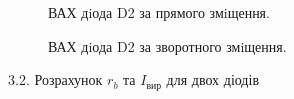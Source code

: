 \documentclass[14pt,a4paper]{scrartcl}
\begin{document}
\begin{figure}[h!]
\caption{ВАХ дiода D2 за прямого змiщення.}
\label{ris:image05}
\end{figure}


\begin{figure}[h]
\caption{ВАХ дiода D2 за зворотного змiщення.}
\label{ris:image4}
\end{figure}

\clearpage
\newpage
\begin{center}3.2. Розрахунок $r_b$ та $I_{\text{вир}}$ для двох діодів\\ \end{center}
\end{document}
